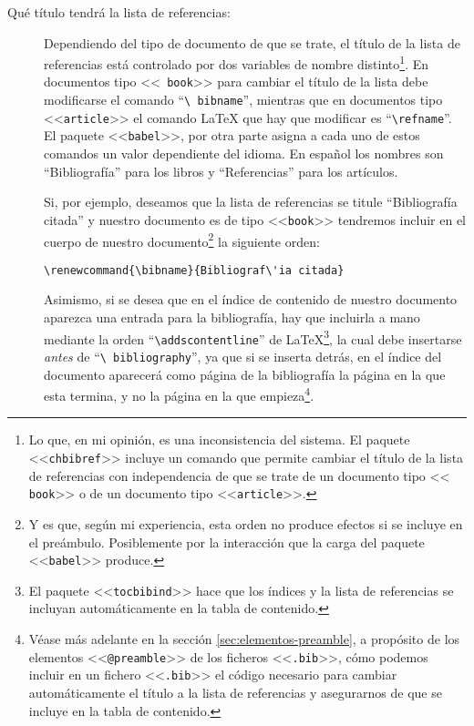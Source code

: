 \documentclass[a4paper,11pt]{article}
\def\ltx-{\LaTeX}
\def\ltr#1-{<<\texttt{#1}>>}
\def\tpf#1-{\ltr.#1-}
\def\cmd#1-{``\texttt{\textbackslash#1}''}
\begin{document}
\begin{description}
\item[Qué  título tendrá  la lista  de referencias:]  Dependiendo del  tipo de
  documento  de que  se  trate, el  título  de la  lista  de referencias  está
  controlado  por dos  variables  de nombre  distinto\footnote{Lo  que, en  mi
    opinión,  es una  inconsistencia del  sistema. El  paquete  \ltr chbibref-
    incluye  un  comando  que  permite  cambiar  el  título  de  la  lista  de
    referencias con  independencia de que se  trate de un  documento tipo \ltr
    book- o  de un  documento tipo \ltr  article-.}.  En documentos  tipo \ltr
  book- para  cambiar el título de  la lista debe modificarse  el comando \cmd
  bibname-, mientras que en documentos tipo \ltr article- el comando \ltx- que
  hay que modificar es \cmd refname-.   El paquete \ltr babel-, por otra parte
  asigna a  cada uno de  estos comandos un  valor dependiente del  idioma.  En
  español los  nombres son ``Bibliografía'' para los  libros y ``Referencias''
  para los artículos.

  Si,  por   ejemplo,  deseamos  que   la  lista  de  referencias   se  titule
  ``Bibliografía citada'' y nuestro documento  es de tipo \ltr book- tendremos
  incluir  en el  cuerpo  de  nuestro documento\footnote{Y  es  que, según  mi
    experiencia, esta orden no produce  efectos si se incluye en el preámbulo.
    Posiblemente  por la  interacción que  la  carga del  paquete \ltr  babel-
    produce.} la siguiente orden:

  \verb|\renewcommand{\bibname}{Bibliograf\'ia citada}|

  Asimismo, si  se desea que  en el índice  de contenido de  nuestro documento
  aparezca una entrada para la bibliografía, hay que incluirla a mano mediante
  la orden \cmd addscontentline-  de \ltx-\footnote{El paquete \ltr tocbibind-
    hace que los índices y la lista de referencias se incluyan automáticamente
    en la tabla  de contenido.}, la cual debe  insertarse \emph{antes} de \cmd
  bibliography-,  ya que  si se  inserta detrás,  en el  índice  del documento
  aparecerá como página de la bibliografía la página en la que esta termina, y
  no la  página en  la que empieza\footnote{Véase  más adelante en  la sección
    \ref{sec:elementos-preamble}, a propósito de los elementos \ltr @preamble-
    de los ficheros \tpf bib-, cómo podemos incluir en un fichero \tpf bib- el
    código  necesario para  cambiar automáticamente  el título  a la  lista de
    referencias y asegurarnos de que se incluye en la tabla de contenido.}.
 
\end{description}
\end{document}
